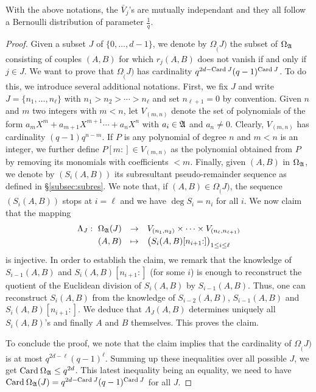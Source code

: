 \documentclass{article}
\begin{document}
\begin{prop}
\label{prop:distribk}
With the above notations, the $\bar V_j$'s are mutually independant
and they all follow a Bernoulli distribution of parameter $\frac 1 q$.
\end{prop}

\begin{proof} 
Given a subset $J$ of $\{0, \ldots, d-1\}$, we denote by 
$\Omega_\ring(J)$ the subset of $\Omega_\mathfrak A$ consisting of
couples $(A,B)$ for which $r_j(A,B)$ does not vanish if and only if $j 
\in J$. We want to prove that $\Omega_\ring(J)$ has cardinality 
$q^{2d-\text{\rm Card}\: J} (q-1)^{\text{\rm Card}\: J}$. To do this, we introduce several 
additional notations. First, we fix $J$ and write $J = \{n_1, \ldots, 
n_\ell\}$ with $n_1 > n_2 > \cdots > n_\ell$ and set $n_{\ell+1} = 
0$ by convention. Given $n$ and $m$ two integers with $m < n$, let 
$V_{(m,n)}$ denote the set of polynomials of the form
$a_m X^m + a_{m+1} X^{m+1} \cdots + a_n X^n$
with $a_i \in \mathfrak A$ and $a_n \neq 0$. Clearly, $V_{(m,n)}$ has
cardinality $(q-1) q^{n-m}$. If $P$ is any polynomial of 
degree $n$ and $m < n$ is an integer, we further define $P[m{:}] \in 
V_{(m,n)}$ as the polynomial obtained from $P$ by removing its monomials 
with coefficients $< m$. Finally, given $(A,B)$ in $\Omega_\mathfrak A$, we 
denote by $(S_i(A,B))$ its subresultant pseudo-remainder sequence as 
defined in \S \ref{subsec:subres}. We note that, if $(A,B) \in 
\Omega_\ring(J)$, the sequence $(S_i(A,B))$ stops at $i = \ell$ and we 
have $\deg S_i = n_i$ for all $i$. We now claim that the mapping
$$\begin{array}{rcl} 
\Lambda_J : \,\, 
\Omega_\ring(J) & \to & 
V_{(n_1,n_2)} \times \cdots \times V_{(n_\ell,n_{\ell+1})} \smallskip \\
(A,B) & \mapsto & 
\big(S_i(A,B)[n_{i+1}{:}]\big)_{1 \leq i \leq \ell}
\end{array}$$ 
is injective. In order to establish the claim, we remark that the 
knowledge of $S_{i-1}(A,B)$ and $S_i(A,B)[n_{i+1}{:}]$ (for some $i$) 
is enough to reconstruct the quotient of the Euclidean division of 
$S_i(A,B)$ by $S_{i-1}(A,B)$. Thus, one can reconstruct $S_i(A,B)$ from 
the knowledge of 
$S_{i-2}(A,B)$, $S_{i-1}(A,B)$ and $S_i(A,B)[n_{i+1}{:}]$. We deduce 
that $\Lambda_J(A,B)$ determines uniquely all $S_i(A,B)$'s 
and finally $A$ and $B$ themselves. This proves the claim.

To conclude the proof, we note that the claim implies that the cardinality of 
$\Omega_\ring(J)$ is at most $q^{2d-\ell} (q-1)^\ell$. Summing up these 
inequalities over all possible $J$, we get $\text{\rm Card}\: \Omega_\mathfrak A \leq 
q^{2d}$. This latest inequality being an equality, we need to have
$\text{\rm Card}\: \Omega_\mathfrak A(J) = q^{2d-\text{\rm Card}\: J} (q-1)^{\text{\rm Card}\: J}$ for all $J$.
\end{proof}
\end{document}
